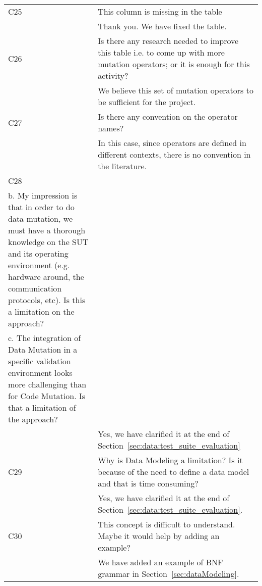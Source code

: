 \begin{longtable}{|p{1.2cm}|p{12cm}|@{}}
\hline
C25&
This column is missing in the table
\\
\cmidrule{2-2}
&Thank you. We have fixed the table.
\\

\hline
C26&
Is there any research needed to improve this table i.e. to come up with more mutation operators; or it is enough for this activity?
\\
&We believe this set of mutation operators to be sufficient for the project.
\\
\hline
C27&
Is there any convention on the operator names?
\\
\cmidrule{2-2}
&In this case, since operators are defined in different contexts, there is no convention in the literature.
\\

\hline
C28&
\begin{minipage}{10cm}
a. Is Run-Time Scalability a limitation in data mutation?\\
b. My impression is that in order to do data mutation, we must have a thorough knowledge on the SUT and its operating environment (e.g. hardware
around, the communication protocols, etc). Is this a limitation on the approach?\\
c. The integration of Data Mutation in a specific validation environment looks more challenging than for Code Mutation. Is that a limitation of the
approach?
\end{minipage}
\\
\cmidrule{2-2}
&Yes, we have clarified it at the end of Section~\ref{sec:data:test_suite_evaluation}
\\
\hline
C29&
Why is Data Modeling a limitation? Is it because of the need to define a data model and that is time consuming?
\\
\cmidrule{2-2}
&Yes, we have clarified it at the end of Section~\ref{sec:data:test_suite_evaluation}.
\\
\hline
C30&
This concept is difficult to understand. Maybe it would help by adding an example?
\\
\cmidrule{2-2}
&We have added an example of BNF grammar in Section~\ref{sec:dataModeling}.
\\


\bottomrule                                                             
\end{longtable}
\normalsize

\clearpage